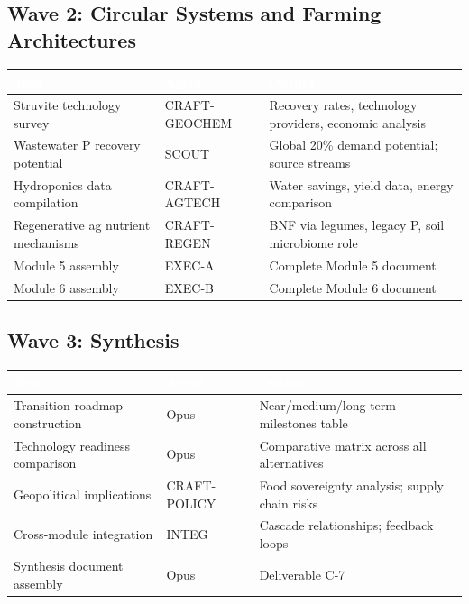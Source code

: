 \documentclass[11pt,letterpaper]{article}
\newcommand{\tableheader}[1]{\textbf{\sffamily\textcolor{white}{#1}}}
\begin{document}
\subsection{Wave 2: Circular Systems and Farming Architectures}

\begin{center}
\begin{tabularx}{\textwidth}{L{3cm}L{2.5cm}X}
\toprule
{}
\tableheader{Task} & \tableheader{Agent} & \tableheader{Output} \\
\midrule
Struvite technology survey & CRAFT-GEOCHEM & Recovery rates, technology providers, economic analysis \\
Wastewater P recovery potential & SCOUT & Global 20\% demand potential; source streams \\
Hydroponics data compilation & CRAFT-AGTECH & Water savings, yield data, energy comparison \\
Regenerative ag nutrient mechanisms & CRAFT-REGEN & BNF via legumes, legacy P, soil microbiome role \\
Module 5 assembly & EXEC-A & Complete Module 5 document \\
Module 6 assembly & EXEC-B & Complete Module 6 document \\
\bottomrule
\end{tabularx}
\end{center}

\subsection{Wave 3: Synthesis}

\begin{center}
\begin{tabularx}{\textwidth}{L{3cm}L{2.5cm}X}
\toprule
{}
\tableheader{Task} & \tableheader{Agent} & \tableheader{Output} \\
\midrule
Transition roadmap construction & Opus & Near/medium/long-term milestones table \\
Technology readiness comparison & Opus & Comparative matrix across all alternatives \\
Geopolitical implications & CRAFT-POLICY & Food sovereignty analysis; supply chain risks \\
Cross-module integration & INTEG & Cascade relationships; feedback loops \\
Synthesis document assembly & Opus & Deliverable C-7 \\
\bottomrule
\end{tabularx}
\end{center}
\end{document}

